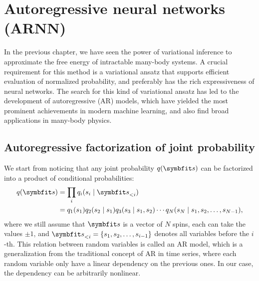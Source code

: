 \chapter{Autoregressive neural networks (ARNN)}
\label{sec:arnn}

In the previous chapter, we have seen the power of variational inference to approximate the free energy of intractable many-body systems. A crucial requirement for this method is a variational ansatz that supports efficient evaluation of normalized probability, and preferably has the rich expressiveness of neural networks. The search for this kind of variational ansatz has led to the development of autoregressive (AR) models, which have yielded the most prominent achievements in modern machine learning, and also find broad applications in many-body physics.

\section{Autoregressive factorization of joint probability}

We start from noticing that any joint probability $q(\vs)$ can be factorized into a product of conditional probabilities:
\begin{align}
q(\vs) &= \prod_i q_i(s_i \mid \vs_{< i}) \label{eq:autoreg} \\
&= q_1(s_1) q_2(s_2 \mid s_1) q_3(s_3 \mid s_1, s_2) \cdots q_N(s_N \mid s_1, s_2, \ldots, s_{N - 1}),
\end{align}
where we still assume that $\vs$ is a vector of $N$ spins, each can take the values $\pm 1$, and $\vs_{< i} = \{s_1, s_2, \ldots, s_{i - 1}\}$ denotes all variables before the $i$-th. This relation between random variables is called an AR model, which is a generalization from the traditional concept of AR in time series, where each random variable only have a linear dependency on the previous ones. In our case, the dependency can be arbitrarily nonlinear.

